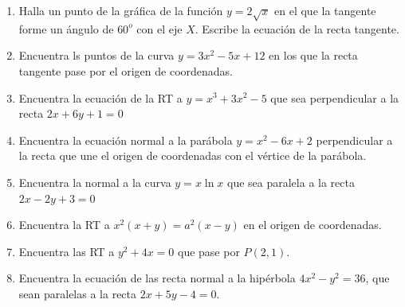\begin{enumerate}
		\rightline{\textcolor{gris}{$c) \; y=-x+7 \; \wedge \; y=x+1; \quad d)\; y=1$}}
		
		\item Halla un punto de la gráfica de la función $y=2\sqrt{x}$ en el que la tangente forme un ángulo de $60^o$ con el eje $X$. Escribe la ecuación de la recta tangente.
		
		
		\item Encuentra ls puntos de la curva $y=3x^2-5x+12$ en los que la recta tangente pase por el origen de coordenadas.
		
		\rightline{\textcolor{gris}{Solución: $y=-17x; \;  y=7x$}} 
		
		\item Encuentra la ecuación de la RT a $y=x^3+3x^2-5$ que sea perpendicular a la recta $2x+6y+1=0$
		
		\rightline{\textcolor{gris}{Solución: $3x+y+6=0$}}
		
		\item Encuentra la ecuación normal a la parábola $y=x^2-6x+2$ perpendicular a la recta que une el origen de coordenadas con el vértice de la parábola.
		
		\rightline{\textcolor{gris}{Solución: $4x-4y-21=0$}}
		
		\item Encuentra la normal a la curva $y=x\ln x$ que sea paralela a la recta $2x-2y+3=0$
		
		
		\item Encuentra la RT a $x^2(x+y)=a^2(x-y)$ en el origen de coordenadas.
		
		\rightline{\textcolor{gris}{Solución: $y=x$}}
		
		\item Encuentra las RT a $y^2+4x=0$ que pase por $P(2,1)$.
		
		\rightline{\textcolor{gris}{Solución: $x+2y-4=0;\; \; x-y-1=0$}}
		
		\item Encuentra la ecuación de las recta normal a la hipérbola $4x^2-y^2=36$, que sean paralelas a la recta $2x+5y-4=0$.
	
		\rightline{\textcolor{gris}{Solución: $2x+5y-50=0; \; \; 2x+5y+50=0$}}
		

\end{enumerate}
